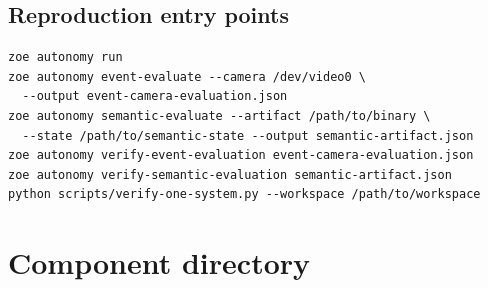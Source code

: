 \documentclass[11pt]{article}
\begin{document}
\subsection{Reproduction entry points}

\begin{lstlisting}
zoe autonomy run
zoe autonomy event-evaluate --camera /dev/video0 \
  --output event-camera-evaluation.json
zoe autonomy semantic-evaluate --artifact /path/to/binary \
  --state /path/to/semantic-state --output semantic-artifact.json
zoe autonomy verify-event-evaluation event-camera-evaluation.json
zoe autonomy verify-semantic-evaluation semantic-artifact.json
python scripts/verify-one-system.py --workspace /path/to/workspace
\end{lstlisting}

\clearpage
\section{Component directory}
\end{document}
